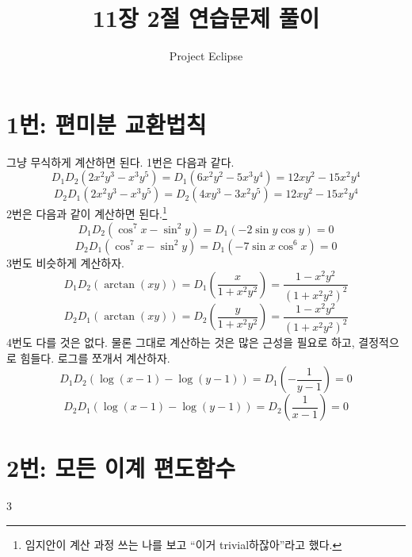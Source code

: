 \documentclass{scrartcl}
\title{11장 2절 연습문제 풀이}
\author{Project Eclipse}
\date{}
\begin{document}
\maketitle

\section{1번: 편미분 교환법칙}
그냥 무식하게 계산하면 된다. 1번은 다음과 같다.
\[D_1D_2(2x^2y^3-x^3y^5)=D_1(6x^2y^2-5x^3y^4)=12xy^2-15x^2y^4\]
\[D_2D_1(2x^2y^3-x^3y^5)=D_2(4xy^3-3x^2y^5)=12xy^2-15x^2y^4\]
2번은 다음과 같이 계산하면 된다.\footnote{임지안이 계산 과정 쓰는 나를 보고 ``이거 trivial하잖아''라고 했다.}
\[D_1D_2(\cos^7 x-\sin^2 y)=D_1(-2\sin y\cos y)=0\]
\[D_2D_1(\cos^7 x-\sin^2 y)=D_1(-7\sin x\cos^6 x)=0\]
3번도 비슷하게 계산하자.
\[D_1D_2(\arctan (xy))=D_1\left(\frac{x}{1+x^2y^2}\right)=\frac{1-x^2y^2}{(1+x^2y^2)^2}\]
\[D_2D_1(\arctan (xy))=D_2\left(\frac{y}{1+x^2y^2}\right)=\frac{1-x^2y^2}{(1+x^2y^2)^2}\]
4번도 다를 것은 없다. 물론 그대로 계산하는 것은 많은 근성을 필요로 하고, 결정적으로 힘들다. 로그를 쪼개서 계산하자.
\[D_1D_2(\log(x-1)-\log(y-1))=D_1\left(-\frac{1}{y-1}\right)=0\]
\[D_2D_1(\log(x-1)-\log(y-1))=D_2\left(\frac{1}{x-1}\right)=0\]

\section{2번: 모든 이계 편도함수}
3
\end{document}
